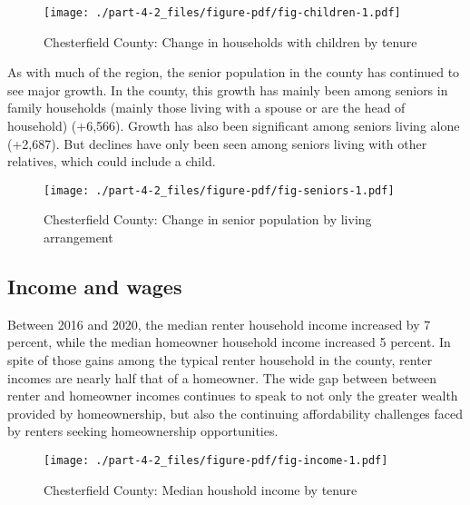 \documentclass[
  letterpaper,
  DIV=11,
  numbers=noendperiod]{scrreprt}
\begin{document}
\begin{figure}

{\centering \texttt{[image: ./part-4-2\_files/figure-pdf/fig-children-1.pdf]}

}

\caption{\label{fig-children}Chesterfield County: Change in households
with children by tenure}

\end{figure}

As with much of the region, the senior population in the county has
continued to see major growth. In the county, this growth has mainly
been among seniors in family households (mainly those living with a
spouse or are the head of household) (+6,566). Growth has also been
significant among seniors living alone (+2,687). But declines have only
been seen among seniors living with other relatives, which could include
a child.

\begin{figure}

{\centering \texttt{[image: ./part-4-2\_files/figure-pdf/fig-seniors-1.pdf]}

}

\caption{\label{fig-seniors}Chesterfield County: Change in senior
population by living arrangement}

\end{figure}

\hypertarget{income-and-wages-1}{%
\subsection{Income and wages}\label{income-and-wages-1}}

Between 2016 and 2020, the median renter household income increased by 7
percent, while the median homeowner household income increased 5
percent. In spite of those gains among the typical renter household in
the county, renter incomes are nearly half that of a homeowner. The wide
gap between between renter and homeowner incomes continues to speak to
not only the greater wealth provided by homeownership, but also the
continuing affordability challenges faced by renters seeking
homeownership opportunities.

\begin{figure}

{\centering \texttt{[image: ./part-4-2\_files/figure-pdf/fig-income-1.pdf]}

}

\caption{\label{fig-income}Chesterfield County: Median houshold income
by tenure}

\end{figure}
\end{document}
